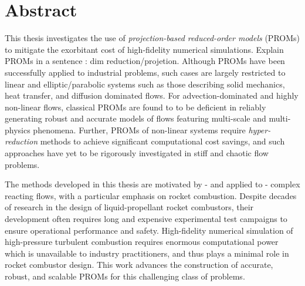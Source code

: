 \chapter{Abstract}


This thesis investigates the use of \textit{projection-based reduced-order models} (PROMs) to mitigate the exorbitant cost of high-fidelity numerical simulations. {\color{red} Explain PROMs in a sentence : dim reduction/projetion}.  Although PROMs have been successfully applied to industrial problems, such cases are largely restricted to linear and elliptic/parabolic systems such as those describing solid mechanics, heat transfer, and diffusion dominated flows. For advection-dominated and highly non-linear flows, classical PROMs are found to to be deficient in reliably generating robust and accurate models of flows featuring multi-scale and multi-physics phenomena. Further, PROMs of non-linear systems require \textit{hyper-reduction} methods to achieve significant computational cost savings, and such approaches have yet to be rigorously investigated in stiff and chaotic  flow problems.

The methods developed in this thesis are motivated by - and applied to - complex reacting flows, with a particular emphasis on rocket combustion.
Despite decades of research in the design of liquid-propellant rocket combustors, their development often requires long and expensive experimental test campaigns to ensure operational performance and safety. %
High-fidelity numerical simulation of high-pressure turbulent combustion requires enormous computational power which is unavailable to industry practitioners, and thus plays a minimal role in rocket combustor design.
This  work advances the construction of accurate, robust, and scalable PROMs for this challenging class of problems.

